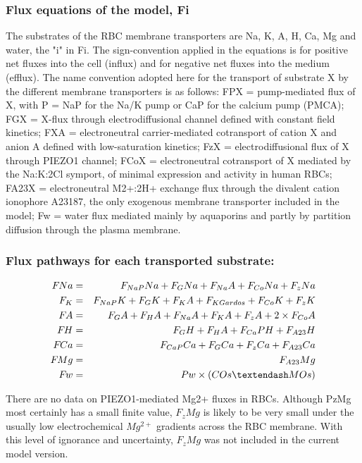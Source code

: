 \documentclass[a4paper]{article}
\newcommand{\med}[1]{M#1}
\newcommand{\cell}[1]{C#1}
\newcommand{\MOs}{\med{Os}}
\newcommand{\COs}{\cell{Os}}
\newcommand{\F}[2]{F_{#1}#2}
\begin{document}
\subsubsection{Flux equations of the model, Fi}
The substrates of the RBC membrane transporters are Na, K, A, H, Ca, Mg and water, the "i" in Fi.  The sign-convention applied in the equations is for positive net fluxes into the cell (influx) and for negative net fluxes into the medium (efflux). The name convention adopted here for the transport of substrate X by the different membrane transporters is as follows: FPX = pump-mediated flux of X, with P = NaP for the Na/K pump or CaP for the calcium pump (PMCA); FGX = X-flux through electrodiffusional channel defined with constant field kinetics; FXA = electroneutral carrier-mediated cotransport of cation X and anion A defined with low-saturation kinetics; FzX = electrodiffusional flux of X through PIEZO1 channel; FCoX = electroneutral cotransport of X mediated by the Na:K:2Cl symport, of minimal expression and activity in human RBCs; FA23X = electroneutral M2+:2H+ exchange flux through the divalent cation ionophore A23187, the only exogenous membrane transporter included in the model; Fw = water flux mediated mainly by aquaporins and partly by partition diffusion through the plasma membrane.  

\setcounter{equation}{0}
\renewcommand{\theequation}{10.\alph{equation}}

\subsubsection{Flux pathways for each transported substrate:}
\begin{eqnarray}
\F{}{Na} &=& \F{NaP}{Na} + \F{G}{Na} + \F{Na}{A} + \F{Co}{Na} + \F{z}{Na}\\
\F{K} &=& \F{NaP}{K} + \F{G}{K} + \F{K}{A} + \F{KGardos} + \F{Co}{K} + \F{z}{K}\\
\F{}{A} &=& \F{G}{A} + \F{H}{A} + \F{Na}{A} + \F{K}{A} + \F{z}{A} + 2\times\F{Co}{A}\\
\F{}{H} &=& \F{G}{H} + \F{H}{A} + \F{Ca}{PH} + \F{A23}{H} \\
\F{}{Ca} &=& \F{CaP}{Ca} + \F{G}{Ca} + \F{z}{Ca} + \F{A23}{Ca} \\
\F{}{Mg} &=& \F{A23}{Mg} \\
\F{}{w}  &=& Pw\times (\COs – \MOs)
\end{eqnarray}

There are no data on PIEZO1-mediated Mg2+ fluxes in RBCs.  Although PzMg most certainly has a small finite value, $\F{z}{Mg}$ is likely to be very small under the usually low electrochemical $Mg^{2+}$ gradients across the RBC membrane.  With this level of ignorance and uncertainty, $\F{z}{Mg}$ was not included in the current model version.  
\end{document}
